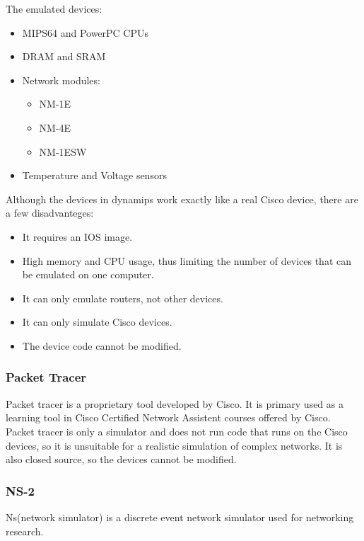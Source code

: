 The emulated devices:
\begin{itemize}
  \item MIPS64 and PowerPC CPUs
  \item DRAM and SRAM
  \item Network modules:
    \begin{itemize}
      \item NM-1E
      \item NM-4E
      \item NM-1ESW
    \end{itemize}
  \item Temperature and Voltage sensors
\end{itemize}

Although the devices in dynamips work exactly like a real Cisco device, there are a few disadvanteges:
\begin{itemize}
  \item It requires an IOS image.
  \item High memory and CPU usage, thus limiting the number of devices that can be emulated on one computer.
  \item It can only emulate routers, not other devices.
  \item It can only simulate Cisco devices.
  \item The device code cannot be modified.
\end{itemize}

\subsubsection{Packet Tracer}

Packet tracer is a proprietary tool developed by Cisco. It is primary used as a learning tool
in Cisco Certified Network Assistent courses offered by Cisco.
Packet tracer is only a simulator and does not run code that runs on the Cisco devices, so
it is unsuitable for a realistic simulation of complex networks. It is also closed source, so
the devices cannot be modified.


\subsubsection{NS-2}
Ns(network simulator) is a discrete event network simulator used for networking research.
